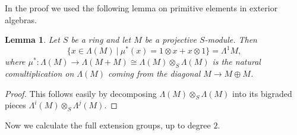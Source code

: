 \documentclass{amsart}
\theoremstyle{plain}
\newtheorem{lemma}[theorem]{Lemma}
\theoremstyle{definition}
\begin{document}
In the proof we used the following lemma on primitive elements in exterior algebras.
 
 \begin{lemma}
   \label{sec:prism-dieud-modul-lemma-on-primitive-elements-in-exterior-algebras}Let $S$ be a ring and let $M$ be a projective $S$-module. Then
   $$
   \{x\in \Lambda(M)\ |\ \mu^\ast(x)=1\otimes x+x\otimes 1\}=\Lambda^1 M,
   $$
   where $\mu^\ast\colon \Lambda(M)\to \Lambda(M+M)\cong \Lambda(M)\otimes_S \Lambda(M)$ is the natural comultiplication on $\Lambda(M)$ coming from the diagonal $M\to M\oplus M$.
 \end{lemma}
 \begin{proof}
   This follows easily by decomposing $\Lambda(M)\otimes_S \Lambda(M)$ into its bigraded pieces $\Lambda^{i}(M)\otimes_S \Lambda^j(M)$.
 \end{proof}

Now we calculate the full extension groups, up to degree $2$.
\end{document}
